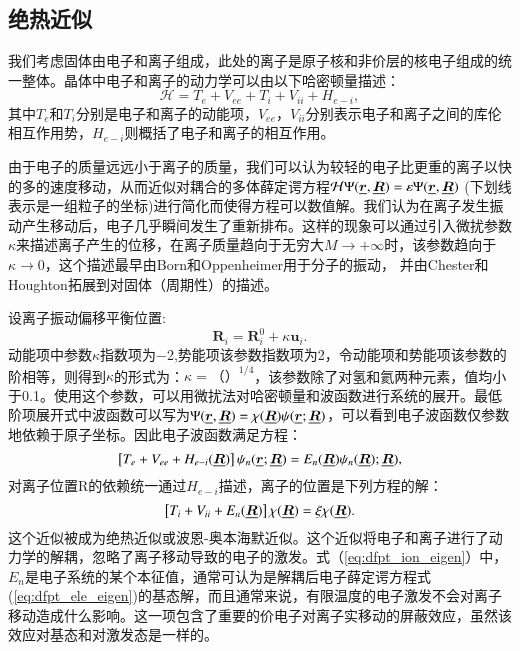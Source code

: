 \subsection{绝热近似}\label{sec:BO-approx}

我们考虑固体由电子和离子组成，此处的离子是原子核和非价层的核电子组成的统一整体。晶体中电子和离子的动力学可以由以下哈密顿量描述：
\begin{equation}
  \mathcal{H} = T_e + V_{ee} + T_i + V_{ii} + H_{e-i},
\end{equation}
其中$T_e$和$T_i$分别是电子和离子的动能项，$ V_{ee}$，$V_{ii}$分别表示电子和离子之间的库伦相互作用势，$H_{e-i}$则概括了电子和离子的相互作用。

由于电子的质量远远小于离子的质量，我们可以认为较轻的电子比更重的离子以快的多的速度移动，从而近似对耦合的多体薛定谔方程$\mathcal{H} \Psi(\underline{\bm{r}},\underline{\bm{R}})=\mathcal{\varepsilon} \Psi(\underline{\bm{r}},\underline{\bm{R}})$ (下划线表示是一组粒子的坐标)进行简化而使得方程可以数值解。我们认为在离子发生振动产生移动后，电子几乎瞬间发生了重新排布。这样的现象可以通过引入微扰参数$\kappa$来描述离子产生的位移，在离子质量趋向于无穷大$M\rightarrow+\infty$时，该参数趋向于$\kappa\rightarrow 0$，这个描述最早由Born和Oppenheimer\cite{oppenheimer1927quantum}用于分子的振动，
并由Chester和Houghton\cite{chester1959electron}拓展到对固体（周期性）的描述。

设离子振动偏移平衡位置:
\begin{equation}
  \bm{R}_i = \bm{R}^0_i + \kappa \bm{u}_i.
\end{equation}
动能项中参数$\kappa$指数项为\num{-2},势能项该参数指数项为\num{2}，令动能项和势能项该参数的阶相等，则得到$\kappa$的形式为：$\kappa=（）^{1/4}$，该参数除了对氢和氦两种元素，值均小于\num{0.1}。使用这个参数，可以用微扰法对哈密顿量和波函数进行系统的展开。最低阶项展开式中波函数可以写为$\Psi(\underline{\bm{r}},\underline{\bm{R}})=\chi(\underline{\bm{R}})\psi(\underline{\bm{r}};\underline{\bm{R}})$，可以看到电子波函数仅参数地依赖于原子坐标。因此电子波函数满足方程：
\begin{equation}\label{eq:dfpt_ele_eigen}
  \left[ T_e + V_{ee} + H_{e-i}(\underline{\bm{R}}) \right]\psi_n(\underline{\bm{r}};\underline{\bm{R}}) = E_n(\underline{\bm{R}})\psi_n(\underline{\bm{R}}); \underline{\bm{R}}),
\end{equation}
对离子位置R的依赖统一通过$H_{e-i}$描述，离子的位置是下列方程的解：
\begin{equation}\label{eq:dfpt_ion_eigen}
  \left[ T_i + V_{ii} + E_n(\underline{\bm{R}}) \right] \chi(\underline{\bm{R}}) = \xi \chi(\underline{\bm{R}}).
\end{equation}
这个近似被成为绝热近似或波恩-奥本海默近似。这个近似将电子和离子进行了动力学的解耦，忽略了离子移动导致的电子的激发。式（\ref{eq:dfpt_ion_eigen}）中，$E_n$是电子系统的某个本征值，通常可认为是解耦后电子薛定谔方程式(\ref{eq:dfpt_ele_eigen})的基态解，而且通常来说，有限温度的电子激发不会对离子移动造成什么影响。这一项包含了重要的价电子对离子实移动的屏蔽效应，虽然该效应对基态和对激发态是一样的。

